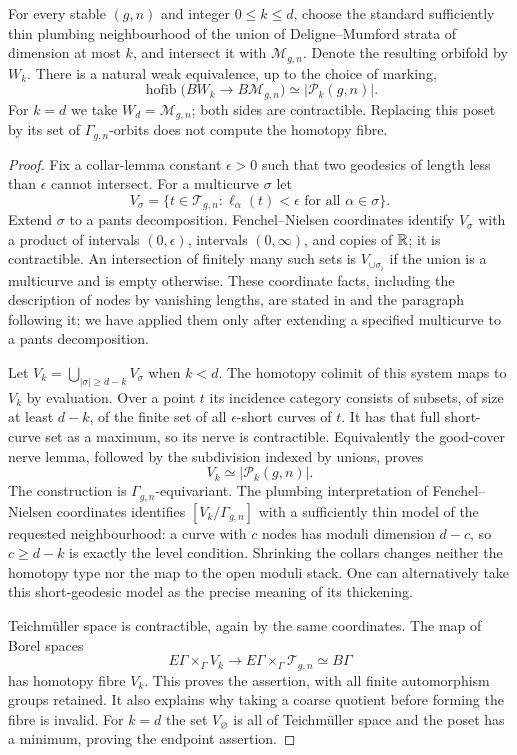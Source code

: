 \begin{theorem}\label{P5b1}
For every stable $(g,n)$ and integer $0\le k\le d$, choose the
standard sufficiently thin plumbing neighbourhood of the union of
Deligne--Mumford strata of dimension at most $k$, and intersect it
with $\mathcal M_{g,n}$.  Denote the resulting orbifold by $W_k$.
There is a natural weak equivalence, up to the choice of marking,
\[
 \operatorname{hofib}\bigl(BW_k\longrightarrow B\mathcal M_{g,n}\bigr)
 \simeq |\mathcal P_k(g,n)|.
\]
For $k=d$ we take $W_d=\mathcal M_{g,n}$; both sides are contractible.
Replacing this poset by its set of $\Gamma_{g,n}$-orbits does not
compute the homotopy fibre.
\end{theorem}
\begin{proof}
Fix a collar-lemma constant $\epsilon>0$ such that two geodesics
of length less than $\epsilon$ cannot intersect.  For a multicurve
$\sigma$ let
\[
 V_\sigma=\{t\in\mathcal T_{g,n}:
        \ell_\alpha(t)<\epsilon\text{ for all }\alpha\in\sigma\}.
\]
Extend $\sigma$ to a pants decomposition.  Fenchel--Nielsen
coordinates identify $V_\sigma$ with a product of intervals
$(0,\epsilon)$, intervals $(0,\infty)$, and copies of $\mathbb R$;
it is contractible.  An intersection of finitely many such sets
is $V_{\cup\sigma_i}$ if the union is a multicurve and is empty
otherwise.  These coordinate facts, including the description of
nodes by vanishing lengths, are stated in \citet[Chapter 1, \S2, Theorem 1.1]{Harer1988} and the paragraph following it; we have applied
them only after extending a specified multicurve to a pants
decomposition.

Let $V_k=\bigcup_{|\sigma|\ge d-k}V_\sigma$ when $k<d$.
The homotopy colimit of this system maps to $V_k$ by evaluation.
Over a point $t$ its incidence category consists of subsets, of
size at least $d-k$, of the finite set of all $\epsilon$-short
curves of $t$.  It has that full short-curve set as a maximum,
so its nerve is contractible.  Equivalently the good-cover nerve
lemma, followed by the subdivision indexed by unions, proves
\[
 V_k\simeq |\mathcal P_k(g,n)|.
\]
The construction is $\Gamma_{g,n}$-equivariant.  The plumbing
interpretation of Fenchel--Nielsen coordinates identifies
$[V_k/\Gamma_{g,n}]$ with a sufficiently thin model of the requested
neighbourhood: a curve with $c$ nodes has moduli dimension $d-c$,
so $c\ge d-k$ is exactly the level condition.  Shrinking the
collars changes neither the homotopy type nor the map to the
open moduli stack.  One can alternatively take this short-geodesic
model as the precise meaning of its thickening.

Teichm\"uller space is contractible, again by the same coordinates.
The map of Borel spaces
\[
 E\Gamma\times_\Gamma V_k\longrightarrow
 E\Gamma\times_\Gamma\mathcal T_{g,n}\simeq B\Gamma
\]
has homotopy fibre $V_k$.  This proves the assertion, with all
finite automorphism groups retained.  It also explains why taking
a coarse quotient before forming the fibre is invalid.  For
$k=d$ the set $V_\varnothing$ is all of Teichm\"uller space and the
poset has a minimum, proving the endpoint assertion.
\end{proof}

